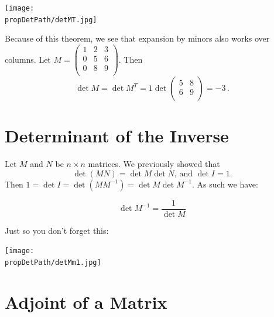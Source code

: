 \begin{center}
\texttt{[image: \\propDetPath/detMT.jpg]}
\end{center}

\begin{example}
Because of this theorem, we see that expansion by minors also works over columns.  Let $M=\begin{pmatrix}
1 & 2 & 3 \\
0 & 5 & 6 \\
0 & 8 & 9 \\
\end{pmatrix}$.  Then \[\det M = \det M^T = 1\det \begin{pmatrix}
5 & 8 \\
6 & 9 \\
\end{pmatrix}=-3\, .\]
\end{example}

\section{Determinant of the Inverse}

Let $M$ and $N$ be $n\times n$ matrices.
We previously showed that 
\[
\det (MN)=\det M \det N \text{, and } \det I=1.
\]
Then $1 = \det I = \det (MM^{-1}) = \det M \det M^{-1}$.  As such we have:
\begin{theorem}
\[
\det M^{-1} = \frac{1}{\det M}
\]
\end{theorem}

Just so you don't forget this:
\begin{center}
\texttt{[image: \\propDetPath/detMm1.jpg]}
\end{center}


\section{Adjoint of a Matrix}


